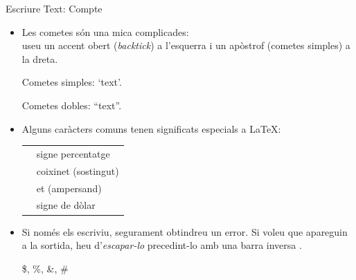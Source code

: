 \begin{frame}[fragile]{Escriure Text: Compte}
\small
\begin{itemize}
\item Les cometes són una mica complicades:\\
useu un accent obert (\textit{backtick}) \keystroke{\`} a l'esquerra i un apòstrof (cometes simples)  a la dreta.
\begin{exampletwouptiny}
Cometes simples: `text'.

Cometes dobles: ``text''.
\end{exampletwouptiny}

\item Alguns caràcters comuns tenen significats especials a \LaTeX:\\[1ex]
\begin{tabular}{cl}
\keystrokebftt{\%} & signe percentatge         \\
\keystrokebftt{\#} & coixinet (sostingut)      \\
\keystrokebftt{\&} & et (ampersand)            \\
\keystrokebftt{\$} & signe de dòlar            \\
\end{tabular}
\item Si només els escriviu, segurament obtindreu un error. 
    Si voleu que apareguin a la sortida, heu d'\textit{escapar-lo} precedint-lo amb una barra inversa \keystroke{\textbackslash}.
\begin{exampletwoup}
\$, \%, \&, \#
\end{exampletwoup}
\end{itemize}
\end{frame}

